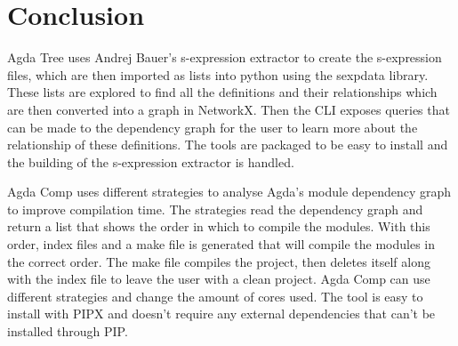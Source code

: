 
\section{Conclusion}

Agda Tree uses Andrej Bauer's s-expression extractor to create the s-expression
files, which are then imported as lists into python using the sexpdata library.
These lists are explored to find all the definitions and their relationships
which are then converted into a graph in NetworkX.  Then the CLI exposes
queries that can be made to the dependency graph for the user to learn more
about the relationship of these definitions. The tools are packaged to be easy
to install and the building of the s-expression extractor is handled.

Agda Comp uses different strategies to analyse Agda's module dependency graph
to improve compilation time. The strategies read the dependency graph and
return a list that shows the order in which to compile the modules. With this
order, index files and a make file is generated that will compile the modules
in the correct order. The make file compiles the project, then deletes itself
along with the index file to leave the user with a clean project. Agda Comp can
use different strategies and change the amount of cores used. The tool is easy
to install with PIPX and doesn't require any external dependencies that can't
be installed through PIP.


